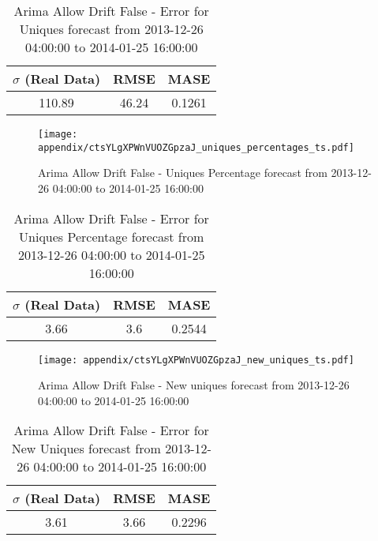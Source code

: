 \begin{table}[H]
\centering
\footnotesize
\begin{tabular}{ccc}
$\sigma$ (Real Data) & RMSE & MASE   \\ \hline
110.89 & 46.24 & 0.1261 \\
\end{tabular}

\vspace{0.5cm}

\caption{
Arima Allow Drift False - Error for Uniques forecast from 2013-12-26 04:00:00 to 2014-01-25 16:00:00}
\end{table}

\begin{figure}[H] \begin{center} \leavevmode
\texttt{[image: appendix/ctsYLgXPWnVUOZGpzaJ\_uniques\_percentages\_ts.pdf]} \caption{
Arima Allow Drift False - Uniques Percentage forecast from 2013-12-26 04:00:00 to 2014-01-25 16:00:00} \label{fig:appendix/ctsYLgXPWnVUOZGpzaJ_uniques_percentages_ts.pdf} \end{center}
\end{figure}

\begin{table}[H]
\centering
\footnotesize
\begin{tabular}{ccc}
$\sigma$ (Real Data) & RMSE & MASE   \\ \hline
3.66 & 3.6 & 0.2544 \\
\end{tabular}

\vspace{0.5cm}

\caption{
Arima Allow Drift False - Error for Uniques Percentage forecast from 2013-12-26 04:00:00 to 2014-01-25 16:00:00}
\end{table}

\begin{figure}[H] \begin{center} \leavevmode
\texttt{[image: appendix/ctsYLgXPWnVUOZGpzaJ\_new\_uniques\_ts.pdf]} \caption{
Arima Allow Drift False - New uniques forecast from 2013-12-26 04:00:00 to 2014-01-25 16:00:00} \label{fig:appendix/ctsYLgXPWnVUOZGpzaJ_new_uniques_ts.pdf} \end{center}
\end{figure}

\begin{table}[H]
\centering
\footnotesize
\begin{tabular}{ccc}
$\sigma$ (Real Data) & RMSE & MASE   \\ \hline
3.61 & 3.66 & 0.2296 \\
\end{tabular}

\vspace{0.5cm}

\caption{
Arima Allow Drift False - Error for New Uniques forecast from 2013-12-26 04:00:00 to 2014-01-25 16:00:00}
\end{table}

